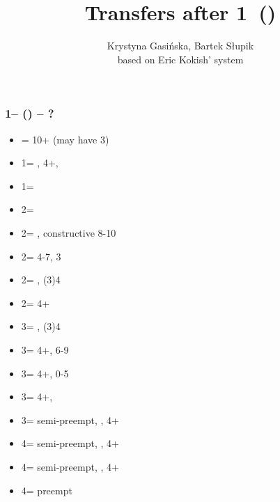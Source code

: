 \documentclass[12pt, a4paper]{article}
\title{Transfers after 1\majs\ (\dbl)}
\author{Krystyna Gasińska, Bartek Słupik\\based on Eric Kokish' system}
\begin{document}
\maketitle


\subsubsection*{1\hearts -- (\dbl) -- ?}
\begin{itemize}
    \item \rdbl = 10+ (may have 3\hearts)
    \item 1\spades = \nat, 4+\spades, \fonce
    \item 1\nt = \trsf{2\clubs}
    \item 2\clubs = \trsf{2\diams}
    \item 2\diams = \trsf{2\hearts}, constructive 8-10
    \item 2\hearts = 4-7, 3\hearts
    \item 2\spades = \spades, (3)4\hearts \invp
    \item 2\nt = 4+\hearts \invp
    \item 3\clubs = \clubs, (3)4\hearts \invp
    \item 3\diams = 4+\hearts, 6-9
    \item 3\hearts = 4+\hearts, 0-5
    \item 3\spades = 4+\hearts, \lsf \vimp
    \item 3\nt = semi-preempt, \spades, 4+\hearts
    \item 4\clubs = semi-preempt, \clubs, 4+\hearts
    \item 4\diams = semi-preempt, \diams, 4+\hearts
    \item 4\hearts = preempt
\end{itemize}
\end{document}
